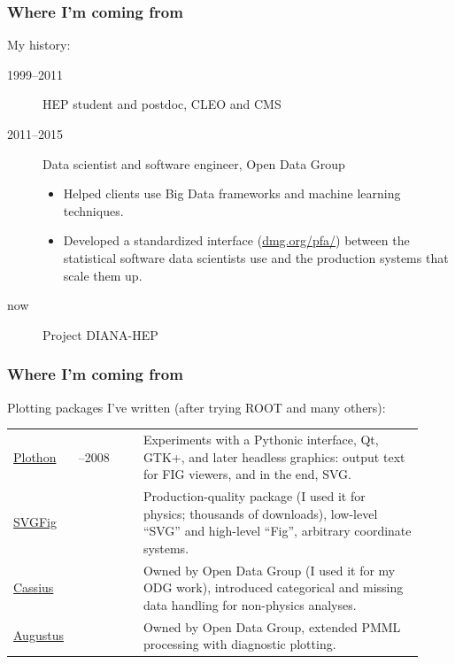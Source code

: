 \documentclass[compress]{beamer}
\begin{document}
\begin{frame}
\frametitle{Where I'm coming from}

My history:
\begin{description}
\item[1999--2011] HEP student and postdoc, CLEO and CMS
\item[2011--2015] Data scientist and software engineer, Open Data Group
\begin{itemize}
\item Helped clients use Big Data frameworks and machine learning techniques.
\item Developed a standardized interface (\textcolor{blue}{\url{dmg.org/pfa/}}) between the statistical software data scientists use and the production systems that scale them up.
\end{itemize}
\item[now] Project DIANA-HEP
\end{description}

\vfill
{}
\end{frame}

\begin{frame}
\frametitle{Where I'm coming from}

Plotting packages I've written (after trying ROOT and many others):

\vspace{0.3 cm}
\renewcommand{\arraystretch}{1.5}
\begin{tabular}{p{0.12\linewidth} p{0.15\linewidth} p{0.65\linewidth}}
\textcolor{blue}{\href{http://github.com/jpivarski/plothon}{Plothon}} & \centering 2006--2008 & Experiments with a Pythonic interface, Qt, GTK+, and later headless graphics: output text for FIG viewers, and in the end, SVG. \\
\textcolor{blue}{\href{http://github.com/jpivarski/svgfig}{SVGFig}} & \centering 2008 & Production-quality package (I used it for physics; thousands of downloads), low-level ``SVG'' and high-level ``Fig'', arbitrary coordinate systems. \\
\textcolor{blue}{\href{http://github.com/opendatagroup/cassius}{Cassius}} & \centering 2011 & Owned by Open Data Group (I used it for my ODG work), introduced categorical and missing data handling for non-physics analyses. \\
\textcolor{blue}{\href{http://github.com/opendatagroup/augustus}{Augustus}} & \centering 2013 & Owned by Open Data Group, extended PMML processing with diagnostic plotting. \\
\end{tabular}
\end{frame}
\end{document}
